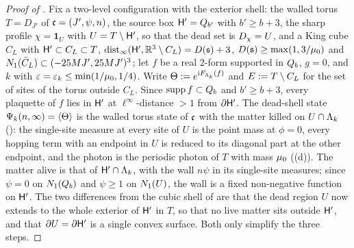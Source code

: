 
\begin{proof}[Proof of ]
Fix a two-level configuration with the exterior shell: the walled torus $T=D_{J'}$ of $\mathfrak c=(J',\psi,n)$, the source box $\mathsf H'=Q_{b'}$ with $b'\ge b+3$, the sharp profile $\chi=\mathbf 1_U$ with $U=T\setminus\mathsf H'$, so that the dead set is $D_\chi=U$, and a King cube $C_L$ with $\mathsf H'\subset C_L\subset T$, $\operatorname{dist}_\infty(\mathsf H',\mathbb R^3\setminus C_L)=D(\mathfrak s)+3$, $D(\mathfrak s)\ge\max(1,3/\mu_0)$ and $N_{1}(\bar C_L)\subset(-25MJ',25MJ')^3$; let $f$ be a real $2$-form supported in $Q_{b}$, $g=0$, and $k$ with $\varepsilon=\varepsilon_k\le\min(1/\mu_0,1/4)$. Write $\Theta:= e^{\mathrm iF_{\Lambda_k}(f)}$ and $E:= T\setminus C_L$ for the set of sites of the torus outside $C_L$. Since $\operatorname{supp} f\subset Q_{b}$ and $b'\ge b+3$, every plaquette of $f$ lies in $\mathsf H'$ at $\ell^\infty$-distance $>1$ from $\partial\mathsf H'$. The dead-shell state $\Psi_k(n,\infty)=\langle\Theta\rangle$ is the walled torus state of $\mathfrak c$ with the matter killed on $U\cap\Lambda_k$ (): the single-site measure at every site of $U$ is the point mass at $\phi=0$, every hopping term with an endpoint in $U$ is reduced to its diagonal part at the other endpoint, and the photon is the periodic photon of $T$ with mass $\mu_0$ ((d)). The matter alive is that of $\mathsf H'\cap\Lambda_k$, with the wall $n\psi$ in its single-site measures; since $\psi=0$ on $N_{1}(Q_{b})$ and $\psi\ge1$ on $N_{1}(U)$, the wall is a fixed non-negative function on $\mathsf H'$. The two differences from the cubic shell of  are that the dead region $U$ now extends to the whole exterior of $\mathsf H'$ in $T$, so that no live matter sits outside $\mathsf H'$, and that $\partial U=\partial\mathsf H'$ is a single convex surface. Both only simplify the three steps.


\end{proof}
